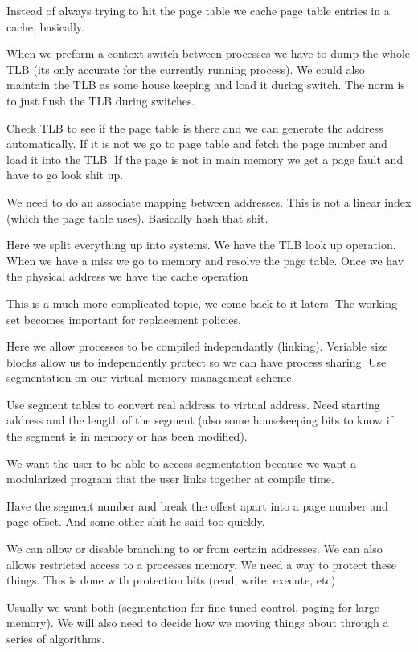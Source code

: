 \documentclass{article}
\begin{document}
Instead of always trying to hit the page table we cache page table entries in a cache, basically.

When we preform a context switch between processes we have to dump the whole TLB (its only accurate for the currently running process). We could also maintain the TLB as some house keeping and load it during switch. The norm is to just flush the TLB during switches.

Check TLB to see if the page table is there and we can generate the address automatically. If it is not we go to page table and fetch the page number and load it into the TLB. If the page is not in main memory we get a page fault and have to go look shit up.

We need to do an associate mapping between addresses. This is not a linear index (which the page table uses). Basically hash that shit.

Here we split everything up into systems. We have the TLB look up operation. When we have a miss we go to memory and resolve the page table. Once we hav the physical address we have the cache operation




This is a much more complicated topic, we come back to it laters. The working set becomes important for replacement policies.



Here we allow processes to be compiled independantly (linking). Veriable size blocks allow us to independently protect so we can have process sharing. Use segmentation on our virtual memory management scheme.

Use segment tables to convert real address to virtual address. Need starting address and the length of the segment (also some housekeeping bits to know if the segment is in memory or has been modified).



We want the user to be able to access segmentation because we want a modularized program that the user links together at compile time.

Have the segment number and break the offest apart into a page number and page offset. And some other shit he said too quickly.


We can allow or disable branching to or from certain addresses. We can also allows restricted access to a processes memory. We need a way to protect these things. This is done with protection bits (read, write, execute, etc)

Usually we want both (segmentation for fine tuned control, paging for large memory). We will also need to decide how we moving things about through a series of algorithms.
\end{document}
